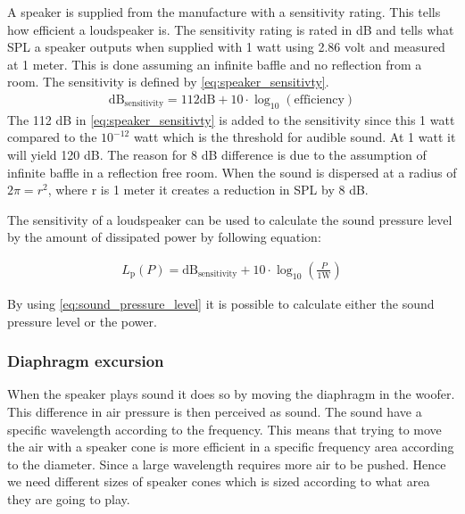 A speaker is supplied from the manufacture with a sensitivity rating. This tells how efficient a loudspeaker is. The sensitivity rating is rated in dB and tells what \gls{SPL} a speaker outputs when supplied with 1 watt using 2.86 volt and measured at 1 meter. This is done assuming an infinite baffle and no reflection from a room. The sensitivity is defined by \autoref{eq:speaker_sensitivty}.
\begin{align}\label{eq:speaker_sensitivty}
\text{dB}_\text{sensitivity}=112\text {dB} +10 \cdot \log_{10}(\text{efficiency})
\end{align}  
The 112 dB in \autoref{eq:speaker_sensitivty} is added to the sensitivity since this 1 watt compared to the $10^{-12}$ watt which is the threshold for audible sound. At 1 watt it will yield 120 dB. The reason for 8 dB difference is due to the assumption of infinite baffle in a reflection free room. When the sound is dispersed at a radius of $2\pi=r^2$, where r is 1 meter it creates a reduction in \gls{SPL} by 8 dB.

The sensitivity of a loudspeaker can be used to calculate the sound pressure level by the amount of dissipated power by following equation:

\begin{align}\label{eq:sound_pressure_level}
L_\text{p}(P)=\text{dB}_\text{sensitivity} + 10\cdot \log_{10} \left(\frac{P}{1 \text{W}}\right)
\end{align} 

By using \autoref{eq:sound_pressure_level} it is possible to calculate either the sound pressure level or the power. %

\subsubsection*{Diaphragm excursion}

When the speaker plays sound it does so by moving the diaphragm in the woofer. This difference in air pressure is then perceived as sound. The sound have a specific wavelength according to the frequency. This means that trying to move the air with a speaker cone is more efficient in a specific frequency area according to the diameter. %
Since a large wavelength requires more air to be pushed. Hence we need different sizes of speaker cones which is sized according to what area they are going to play.

